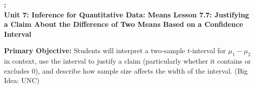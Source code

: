 \documentclass[10pt]{article}
\newcommand{\UnitNumberName}{Unit 7: Inference for Quantitative Data: Means \quad}
\newcommand{\LessonNumberName}{Lesson 7.7: Justifying a Claim About the Difference of Two Means Based on a Confidence Interval}
\begin{document}
\begin{center}
    {\Large\bfseries \CourseName: \SchoolYear \\
    {\small\bfseries \UnitNumberName \LessonNumberName}}
\end{center}

\begin{tcolorbox}[colback=sky, colframe=navy, boxrule=0.9pt, arc=2mm,
    left=2mm, right=2mm, top=1.5mm, bottom=1.5mm]
    \textbf{Primary Objective:} Students will interpret a two-sample $t$-interval for
    $\mu_1 - \mu_2$ in context, use the interval to justify a claim (particularly whether
    it contains or excludes 0), and describe how sample size affects the width of the interval.
    (Big Idea: UNC)
\end{tcolorbox}

\renewcommand{\arraystretch}{1.6}
\end{document}
